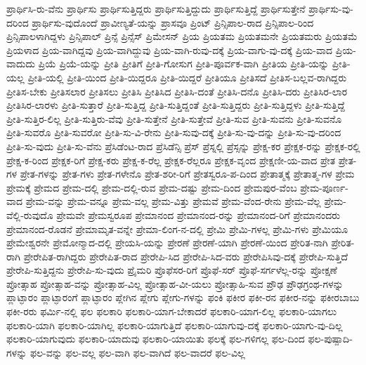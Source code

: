 {ಪ್ರಾರ್ಥಿಸಿ-ರು-ವೆನು
ಪ್ರಾರ್ಥಿಸು
ಪ್ರಾರ್ಥಿಸುತ್ತಿದ್ದರು
ಪ್ರಾರ್ಥಿಸುತ್ತಿದ್ದುದು
ಪ್ರಾರ್ಥಿಸುತ್ತಿದ್ದೆ
ಪ್ರಾರ್ಥಿಸುತ್ತೇನೆ
ಪ್ರಾರ್ಥಿಸು-ವು-ದರಿಂದ
ಪ್ರಾರ್ಥಿಸು-ವುದೊಂದೆ
ಪ್ರಾವೀಣ್ಯತೆ-ಯನ್ನು
ಪ್ರಾಸವೂ
ಪ್ರಿಂಟ್
ಪ್ರಿನ್ಸಿಪಾಲ-ರಾದ
ಪ್ರಿನ್ಸಿಪಾಲ-ರಿಂದ
ಪ್ರಿನ್ಸಿಪಾಲಳಾಗಿದ್ದಳು
ಪ್ರಿನ್ಸಿಪಾಲ್
ಪ್ರಿನ್ಸೆ
ಪ್ರಿನ್ಸೆಸ್
ಪ್ರಿಮೇಸನ್
ಪ್ರಿಯ
ಪ್ರಿಯತಮ
ಪ್ರಿಯತಮನೇ
ಪ್ರಿಯತಮರು
ಪ್ರಿಯತಮೆ
ಪ್ರಿಯಳಾದ
ಪ್ರಿಯ-ವಾಗಿದ್ದವು
ಪ್ರಿಯ-ವಾಗಿದ್ದುವು
ಪ್ರಿಯ-ವಾಗಿ-ರುವು-ದಕ್ಕೆ
ಪ್ರಿಯ-ವಾಗು-ವು-ದಕ್ಕೆ
ಪ್ರಿಯ-ವಾದ
ಪ್ರಿಯ-ವಾದುದು
ಪ್ರಿಯೆ
ಪ್ರಿಯೆ-ಯನ್ನು
ಪ್ರೀತಿ
ಪ್ರೀತಿಗೆ
ಪ್ರೀತಿ-ಗೋಸುಗ
ಪ್ರೀತಿ-ಪೂರ್ವಕ-ವಾಗಿ
ಪ್ರೀತಿಯ
ಪ್ರೀತಿ-ಯನ್ನು
ಪ್ರೀತಿ-ಯಲ್ಲ
ಪ್ರೀತಿ-ಯಲ್ಲಿ
ಪ್ರೀತಿ-ಯಿಂದ
ಪ್ರೀತಿ-ಯಿದ್ದರೂ
ಪ್ರೀತಿ-ಯಿದ್ದರೆ
ಪ್ರೀತಿಯೂ
ಪ್ರೀತಿಸದೆ
ಪ್ರೀತಿಸ-ಬಲ್ಲವ-ರಾಗಿದ್ದರು
ಪ್ರೀತಿಸ-ಬೇಕು
ಪ್ರೀತಿಸಲಾರ
ಪ್ರೀತಿಸಲು
ಪ್ರೀತಿಸಿ
ಪ್ರೀತಿಸಿದ
ಪ್ರೀತಿಸಿ-ದಂತೆ
ಪ್ರೀತಿಸಿ-ದನೊ
ಪ್ರೀತಿಸಿ-ದರು
ಪ್ರೀತಿಸಿರ-ಲಾರ
ಪ್ರೀತಿಸಿರ-ಲಾರಳು
ಪ್ರೀತಿ-ಸುತ್ತಾರೆ
ಪ್ರೀತಿ-ಸುತ್ತಿದ್ದ
ಪ್ರೀತಿ-ಸುತ್ತಿದ್ದಂತೆ
ಪ್ರೀತಿ-ಸುತ್ತಿದ್ದರು
ಪ್ರೀತಿ-ಸುತ್ತಿದ್ದಳು
ಪ್ರೀತಿ-ಸುತ್ತಿದ್ದೆ
ಪ್ರೀತಿ-ಸುತ್ತಿರ-ಲಿಲ್ಲ
ಪ್ರೀತಿ-ಸುತ್ತಿರು-ವೆವು
ಪ್ರೀತಿ-ಸುತ್ತೇನೆ
ಪ್ರೀತಿ-ಸುತ್ತೇವೆ
ಪ್ರೀತಿ-ಸುವ
ಪ್ರೀತಿ-ಸುವನು
ಪ್ರೀತಿ-ಸುವನೊ
ಪ್ರೀತಿ-ಸುವರೊ
ಪ್ರೀತಿ-ಸುವರೋ
ಪ್ರೀತಿ-ಸು-ವಿ-ರೇನು
ಪ್ರೀತಿ-ಸುವು-ದಕ್ಕೆ
ಪ್ರೀತಿ-ಸು-ವು-ದನ್ನು
ಪ್ರೀತಿ-ಸು-ವು-ದರಿಂದ
ಪ್ರೀತಿ-ಸು-ವುದು
ಪ್ರೀತಿ-ಸು-ವೆನು
ಪ್ರೆಸಿಡೆಂಟ-ರಾದ
ಪ್ರೆಸಿಡೆನ್ಸಿ
ಪ್ರೆಸ್
ಪ್ರೆಸ್ನಲ್ಲಿ
ಪ್ರೆಸ್ಸನ್ನು
ಪ್ರೇಕ್ಷ-ಕರ
ಪ್ರೇಕ್ಷಕ-ರನ್ನು
ಪ್ರೇಕ್ಷಕ-ರಲ್ಲಿ
ಪ್ರೇಕ್ಷ-ಕ-ರಿಂದ
ಪ್ರೇಕ್ಷಕ-ರಿಗೆ
ಪ್ರೇಕ್ಷ-ಕರು
ಪ್ರೇಕ್ಷ-ಕ-ರೆಲ್ಲ
ಪ್ರೇಕ್ಷಕ-ರೆಲ್ಲರೂ
ಪ್ರೇಕ್ಷಕ-ವೃಂದ
ಪ್ರೇಕ್ಷಣೀ-ಯ-ವಾದ
ಪ್ರೇತ
ಪ್ರೇತ-ಗಳ
ಪ್ರೇತ-ಗಳನ್ನು
ಪ್ರೇತ-ಗಳು
ಪ್ರೇತ-ಗಳೇನೊ
ಪ್ರೇತ-ಶರೀ-ರಿಗೆ
ಪ್ರೇತಸ್ವರೂ-ಪ-ದಿಂದ
ಪ್ರೇತಾತ್ಮಕ್ಕೆ
ಪ್ರೇತಾತ್ಮ-ಗಳ
ಪ್ರೇಮ
ಪ್ರೇಮಕ್ಕೆ
ಪ್ರೇಮದ
ಪ್ರೇಮ-ದಲ್ಲಿ
ಪ್ರೇಮ-ದಲ್ಲಿ-ರುವ
ಪ್ರೇಮ-ದಷ್ಟು
ಪ್ರೇಮ-ದಿಂದ
ಪ್ರೇಮಪುರ-ವೆಂಬ
ಪ್ರೇಮ-ಪೂರ್ಣ-ವಾದ
ಪ್ರೇಮ-ವನ್ನು
ಪ್ರೇಮ-ವನ್ನೂ
ಪ್ರೇಮ-ವಲ್ಲ
ಪ್ರೇಮ-ವಿತ್ತು
ಪ್ರೇಮವೆ
ಪ್ರೇಮ-ವೆಂದ-ರೇನು
ಪ್ರೇಮ-ವೆಲ್ಲ
ಪ್ರೇಮ-ವೆಲ್ಲಿ-ರುವುದೊ
ಪ್ರೇಮವೇ
ಪ್ರೇಮಸ್ವರೂಪ
ಪ್ರೇಮಾನಂದ
ಪ್ರೇಮಾನಂದ-ರನ್ನು
ಪ್ರೇಮಾನಂದ-ರಿಗೆ
ಪ್ರೇಮಾನಂದರು
ಪ್ರೇಮಾನಂದ-ರೊಡನೆ
ಪ್ರೇಮಾಮೃತ-ವನ್ನೇ
ಪ್ರೇಮಾ-ಲಿಂಗ-ನ-ದಲ್ಲಿ
ಪ್ರೇಮಿ
ಪ್ರೇಮಿ-ಗಳಲ್ಲ
ಪ್ರೇಮಿ-ಗಳು
ಪ್ರೇಮಿಯೂ
ಪ್ರೇಮೇಶ್ವರನೇ
ಪ್ರೇಮೋನ್ಮಾದ-ದಲ್ಲಿ
ಪ್ರೇಯಸಿ-ಯನ್ನು
ಪ್ರೇರಣೆ
ಪ್ರೇರಣೆ-ಯಾಗಿ
ಪ್ರೇರಣೆ-ಯಿಂದ
ಪ್ರೇರಿತ-ನಾಗಿ
ಪ್ರೇರಿತ-ರಾಗಿ
ಪ್ರೇರೇಪಿತ-ರಾಗಿದ್ದರು
ಪ್ರೇರೇಪಿತ-ರಾದ
ಪ್ರೇರೇಪಿ-ಸಿದ
ಪ್ರೇರೇಪಿ-ಸಿದ-ವರು
ಪ್ರೇರೇಪಿಸಿವು-ದಕ್ಕೆ
ಪ್ರೇರೇಪಿ-ಸುತ್ತಿದೆ
ಪ್ರೇರೇಪಿ-ಸುತ್ತಿದ್ದನು
ಪ್ರೇರೇಪಿ-ಸು-ವುದು
ಪ್ರೈಮರಿ
ಪ್ರೊಫೆಸರ-ರಿಗೆ
ಪ್ರೊಫೆ-ಸರ್
ಪ್ರೊಫೆ-ಸರ್ಗಳೆಲ್ಲ-ರನ್ನು
ಪ್ರೋಕ್ಷಣೆ
ಪ್ರೋತ್ಸಾಹ
ಪ್ರೋತ್ಸಾಹ-ವನ್ನು
ಪ್ರೋತ್ಸಾಹ-ವಿಲ್ಲ
ಪ್ರೋತ್ಸಾಹ-ವೀ-ಯಲು
ಪ್ರೋತ್ಸಾಹಿ-ಸುವ
ಪ್ರೌಢ
ಪ್ರೌಢಗ್ರಂಥ-ಗಳನ್ನು
ಪ್ಲಾಟ್ಫಾರಂ
ಪ್ಲಾಟ್ಫಾರಂಗೆ
ಪ್ಲಾಟ್ಫಾರಂ
ಪ್ಲೇಗಿನ
ಪ್ಲೇಗು
ಪ್ಲೇಗು-ಗಳನ್ನು
ಫಂಕಿ
ಫಕೀರ
ಫಕೀ-ರನ
ಫಕೀರ-ನನ್ನು
ಫಕೀರಬಾಬು
ಫಕೀ-ರರು
ಫರ್ಮಿ-ನಲ್ಲಿ
ಫಲ
ಫಲಕಾರಿ
ಫಲಕಾರಿ-ಯಾಗ-ಬೇಕಾದರೆ
ಫಲಕಾರಿ-ಯಾಗ-ಲಿಲ್ಲ
ಫಲಕಾರಿ-ಯಾಗಲು
ಫಲಕಾರಿ-ಯಾಗಿ
ಫಲಕಾರಿ-ಯಾಗಿಲ್ಲ
ಫಲಕಾರಿ-ಯಾಗುತ್ತಿದೆ
ಫಲಕಾರಿ-ಯಾಗುವು-ದಕ್ಕೆ
ಫಲಕಾರಿ-ಯಾಗು-ವು-ದಿಲ್ಲ
ಫಲಕಾರಿ-ಯಾಗುವುದು
ಫಲಕಾರಿ-ಯಾದುವು
ಫಲಕಾರಿ-ಯಾಯಿತು
ಫಲಕ್ಕೆ
ಫಲ-ಗಳಿಗಲ್ಲ
ಫಲ-ದಿಂದ
ಫಲ-ಪುಷ್ಪಾದಿ-ಗಳನ್ನು
ಫಲ-ವನ್ನು
ಫಲ-ವಲ್ಲ
ಫಲ-ವಾಗಿ
ಫಲ-ವಾಗಿದೆ
ಫಲ-ವಾದರೆ
ಫಲ-ವಿಲ್ಲ
}
